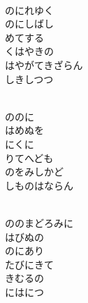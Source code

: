\documentclass[10pt,b5j]{tarticle} %
\begin{document}
\vspace{1.5em} %
\newcommand{\linespace}{0.5em} %
\newcommand{\blocksize}{0.5\hsize} %
\newcommand{\itemmargin}{6em} %
\begin{enumerate} %
    \setlength{\itemindent}{\itemmargin} %
    \begin{minipage}[c]{\blocksize}
    
        \vspace{\linespace}
        \item~\\
        のにれゆく\\
        のにしばし\\
        めてする\\
        くはやきの\\
        はやがてきざらん\\
        しきしつつ
        
        \vspace{\linespace}
        \item~\\
        ののに\\
        はめぬを\\
        にくに\\
        りてへども\\
        のをみしかど\\
        しものはならん
        
        \vspace{\linespace}
        \item~\\
        ののまどろみに\\
        はびぬの\\
        のにあり\\
        たびにきて\\
        きむるの\\
        にはにつ
        

\end{minipage}
\end{enumerate}
\end{document}
